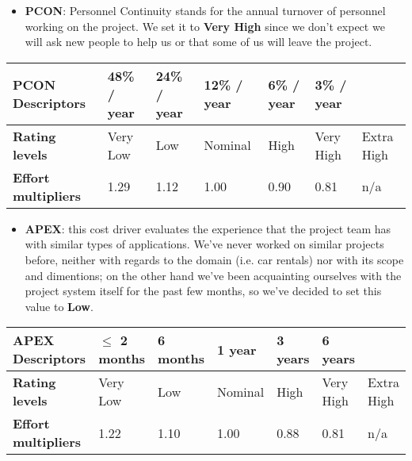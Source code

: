 		
		
		
		\begin{itemize}
			\item \textbf{PCON}: Personnel Continuity stands for the annual turnover of personnel working on the project. We set it to \textbf{Very High} since we don't expect we will ask new people to help us or that some of us will leave the project.
		\end{itemize}
		
		\begin{center}
			\begin{tabular}{ | C{2cm} | C{2cm} | C{2cm} | C{2cm} | C{2cm} | C{2cm} | C{2cm} | }
				\hline
				\textbf{PCON Descriptors} & 48\% / year & 24\% / year & 12\% / year & 6\% / year & 3\% / year & \\ \hline
			
				\textbf{Rating levels} & Very Low & Low & Nominal & High & Very High & Extra High\\ \hline
			
				\textbf{Effort multipliers} & 1.29 & 1.12 & 1.00 & 0.90 & 0.81 & n/a\\ \hline
			\end{tabular}
		\end{center}
		
		
		
		
		\begin{itemize}
			\item \textbf{APEX}: this cost driver evaluates the experience that the project team has with similar types of applications. We've never worked on similar projects before, neither with regards to the domain (i.e. car rentals) nor with its scope and dimentions; on the other hand we've been acquainting ourselves with the project system itself for the past few months, so we've decided to set this value to \textbf{Low}.
		\end{itemize}
		
		\begin{center}
			\begin{tabular}{ | C{2cm} | C{2cm} | C{2cm} | C{2cm} | C{2cm} | C{2cm} | C{2cm} | }
				\hline
				\textbf{APEX Descriptors} & $\leq$ 2 months & 6 months & 1 year & 3 years & 6 years & \\ \hline
			
				\textbf{Rating levels} & Very Low & Low & Nominal & High & Very High & Extra High\\ \hline
			
				\textbf{Effort multipliers} & 1.22 & 1.10 & 1.00 & 0.88 & 0.81 & n/a\\ \hline
			\end{tabular}
		\end{center}
		
